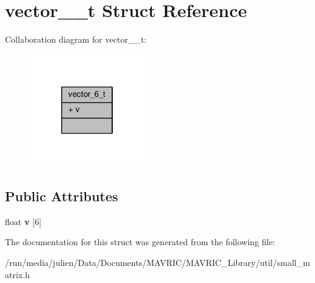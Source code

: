 \hypertarget{structvector__6__t}{\section{vector\+\_\+\_\+t Struct Reference}
\label{structvector__6__t}
}


Collaboration diagram for vector\+\_\+\_\+t\+:
\nopagebreak
\begin{figure}[H]
\begin{center}
\leavevmode
\includegraphics[width=142pt]{structvector__6__t__coll__graph}
\end{center}
\end{figure}
\subsection*{Public Attributes}
\begin{DoxyCompactItemize}
\item 
\hypertarget{structvector__6__t_aa7af73a28ce74ab7d8c4fc0944fb9085}{float {\bfseries v} \mbox{[}6\mbox{]}}\label{structvector__6__t_aa7af73a28ce74ab7d8c4fc0944fb9085}

\end{DoxyCompactItemize}


The documentation for this struct was generated from the following file\+:\begin{DoxyCompactItemize}
\item 
/run/media/julien/\+Data/\+Documents/\+M\+A\+V\+R\+I\+C/\+M\+A\+V\+R\+I\+C\+\_\+\+Library/util/small\+\_\+matrix.\+h\end{DoxyCompactItemize}
